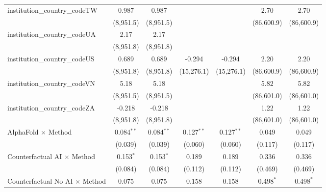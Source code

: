 \begin{tabular}{lcccccc}
   institution\_country\_codeTW          & 0.987         & 0.987         &               &               & 2.70         & 2.70\\   
                                         & (8,951.5)     & (8,951.5)     &               &               & (86,600.9)   & (86,600.9)\\   
   institution\_country\_codeUA          & 2.17          & 2.17          &               &               &              &   \\   
                                         & (8,951.8)     & (8,951.8)     &               &               &              &   \\   
   institution\_country\_codeUS          & 0.689         & 0.689         & -0.294        & -0.294        & 2.20         & 2.20\\   
                                         & (8,951.8)     & (8,951.8)     & (15,276.1)    & (15,276.1)    & (86,600.9)   & (86,600.9)\\   
   institution\_country\_codeVN          & 5.18          & 5.18          &               &               & 5.82         & 5.82\\   
                                         & (8,951.5)     & (8,951.5)     &               &               & (86,601.0)   & (86,601.0)\\   
   institution\_country\_codeZA          & -0.218        & -0.218        &               &               & 1.22         & 1.22\\   
                                         & (8,951.8)     & (8,951.8)     &               &               & (86,601.0)   & (86,601.0)\\   
   AlphaFold $\times$ Method             & 0.084$^{**}$  & 0.084$^{**}$  & 0.127$^{**}$  & 0.127$^{**}$  & 0.049        & 0.049\\   
                                         & (0.039)       & (0.039)       & (0.060)       & (0.060)       & (0.117)      & (0.117)\\   
   Counterfactual AI $\times$ Method     & 0.153$^{*}$   & 0.153$^{*}$   & 0.189         & 0.189         & 0.336        & 0.336\\   
                                         & (0.084)       & (0.084)       & (0.112)       & (0.112)       & (0.469)      & (0.469)\\   
   Counterfactual No AI $\times$ Method  & 0.075         & 0.075         & 0.158         & 0.158         & 0.498$^{*}$  & 0.498$^{*}$\\   

\end{tabular}
